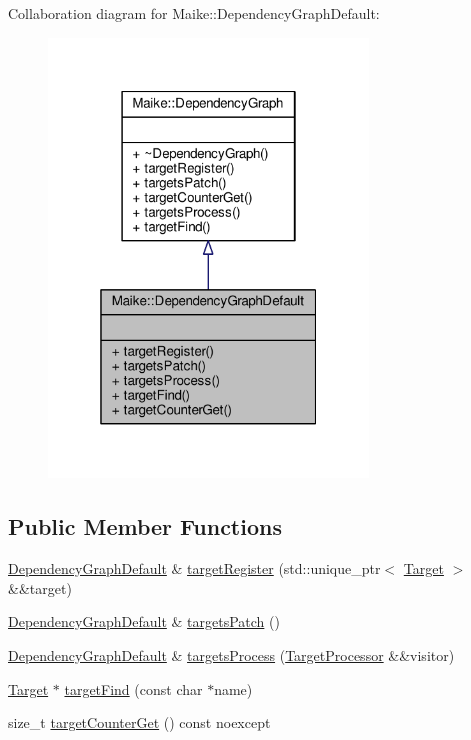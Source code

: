 Collaboration diagram for Maike\+:\+:Dependency\+Graph\+Default\+:\nopagebreak
\begin{figure}[H]
\begin{center}
\leavevmode
\includegraphics[width=241pt]{class_maike_1_1_dependency_graph_default__coll__graph}
\end{center}
\end{figure}
\subsection*{Public Member Functions}
\begin{DoxyCompactItemize}
\item 
\hyperlink{class_maike_1_1_dependency_graph_default}{Dependency\+Graph\+Default} \& \hyperlink{class_maike_1_1_dependency_graph_default_a36a6b993ce9a0496b3af282fa84d0be2}{target\+Register} (std\+::unique\+\_\+ptr$<$ \hyperlink{class_maike_1_1_target}{Target} $>$ \&\&target)
\item 
\hyperlink{class_maike_1_1_dependency_graph_default}{Dependency\+Graph\+Default} \& \hyperlink{class_maike_1_1_dependency_graph_default_ad4d840ced36a682f4b7da6d49dd139c1}{targets\+Patch} ()
\item 
\hyperlink{class_maike_1_1_dependency_graph_default}{Dependency\+Graph\+Default} \& \hyperlink{class_maike_1_1_dependency_graph_default_ac669b8f05435f454c72cd256e66a0b2c}{targets\+Process} (\hyperlink{class_maike_1_1_dependency_graph_1_1_target_processor}{Target\+Processor} \&\&visitor)
\item 
\hyperlink{class_maike_1_1_target}{Target} $\ast$ \hyperlink{class_maike_1_1_dependency_graph_default_aa6f83242aa03c9d1141d896d6d120179}{target\+Find} (const char $\ast$name)
\item 
size\+\_\+t \hyperlink{class_maike_1_1_dependency_graph_default_afaba2cc265e1771f9743c03139c66531}{target\+Counter\+Get} () const noexcept
\end{DoxyCompactItemize}


